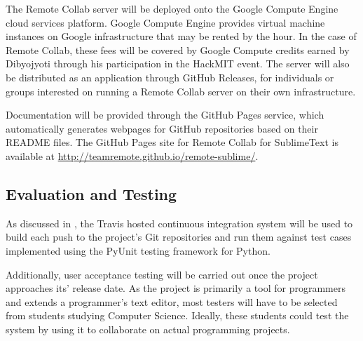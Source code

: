 \documentclass[11pt,english]{article}
\begin{document}
		The Remote Collab server will be deployed onto the Google Compute Engine\cite{googlecompute} cloud services platform. Google Compute Engine provides virtual machine instances on Google infrastructure that may be rented by the hour. In the case of Remote Collab, these fees will be covered by Google Compute credits earned by Dibyojyoti through his participation in the HackMIT event. The server will also be distributed as an application through GitHub Releases, for individuals or groups interested on running a Remote Collab server on their own infrastructure.

		Documentation will be provided through the GitHub Pages\cite{gh-pages} service, which automatically generates webpages for GitHub repositories based on their README files. The GitHub Pages site for Remote Collab for SublimeText is available at \url{http://teamremote.github.io/remote-sublime/}.

	\subsection{Evaluation and Testing}
		As discussed in , the Travis hosted continuous integration system will be used to build each push to the project's Git repositories and run them against test cases implemented using the PyUnit testing framework for Python.

		Additionally, user acceptance testing will be carried out once the project approaches its' release date. As the project is primarily a tool for programmers and extends a programmer's text editor, most testers will have to be selected from students studying Computer Science. Ideally, these students could test the system by using it to collaborate on actual programming projects.

	\pagebreak
	
	
\end{document}
